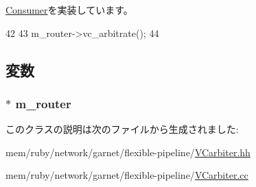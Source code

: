 \hyperlink{classConsumer_a623e3e7d1b1c725d70009f7b01a421b9}{Consumer}を実装しています。


\begin{DoxyCode}
42 {
43     m_router->vc_arbitrate();
44 }
\end{DoxyCode}


\subsection{変数}
\hypertarget{classVCarbiter_a6886b69e234a3d5fbea014763cd377f2}{
\subsubsection[{m\_\-router}]{$\ast$ {\bf m\_\-router}}}
\label{classVCarbiter_a6886b69e234a3d5fbea014763cd377f2}


このクラスの説明は次のファイルから生成されました:\begin{DoxyCompactItemize}
\item 
mem/ruby/network/garnet/flexible-\/pipeline/\hyperlink{VCarbiter_8hh}{VCarbiter.hh}\item 
mem/ruby/network/garnet/flexible-\/pipeline/\hyperlink{VCarbiter_8cc}{VCarbiter.cc}\end{DoxyCompactItemize}
